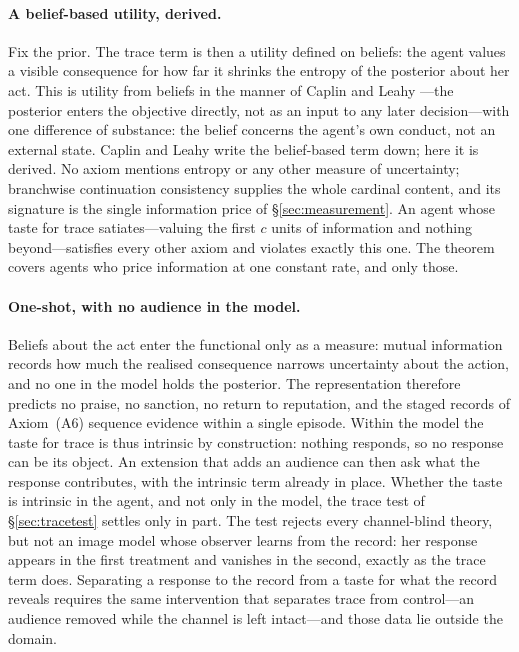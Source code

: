 \documentclass[11pt,a4paper]{article}
\theoremstyle{definition}
\newcommand{\1}{\mathbf 1}
\begin{document}
\paragraph{A belief-based utility, derived.}
Fix the prior.  The trace term is then a utility defined on beliefs: the agent values a visible
consequence for how far it shrinks the entropy of the posterior about her act.  This is utility
from beliefs in the manner of Caplin and Leahy \cite{CaplinLeahy2001}---the posterior enters the
objective directly, not as an input to any later decision---with one difference of substance: the
belief concerns the agent's own conduct, not an external state.  Caplin and Leahy write the
belief-based term down; here it is derived.  No axiom mentions entropy or any other measure of
uncertainty; branchwise continuation consistency supplies the whole cardinal content, and its
signature is the single information price of \S\ref{sec:measurement}.  An agent whose taste for
trace satiates---valuing the first $c$ units of information and nothing beyond---satisfies every
other axiom and violates exactly this one.  The theorem covers agents who price information at one
constant rate, and only those.

\paragraph{One-shot, with no audience in the model.}
Beliefs about the act enter the functional only as a measure: mutual information records how much
the realised consequence narrows uncertainty about the action, and no one in the model holds the
posterior.  The representation therefore predicts no praise, no sanction, no return to reputation,
and the staged records of Axiom~\textup{(A6)} sequence evidence within a single episode.  Within
the model the taste for trace is thus intrinsic by construction: nothing responds, so no response
can be its object.  An extension that adds an audience can then ask what the response contributes,
with the intrinsic term already in place.  Whether the taste is intrinsic in the agent, and not
only in the model, the trace test of \S\ref{sec:tracetest} settles only in part.  The test rejects
every channel-blind theory, but not an image model whose observer learns from the record: her
response appears in the first treatment and vanishes in the second, exactly as the trace term
does.  Separating a response to the record from a taste for what the record reveals requires the
same intervention that separates trace from control---an audience removed while the channel is
left intact---and those data lie outside the domain.
\end{document}
